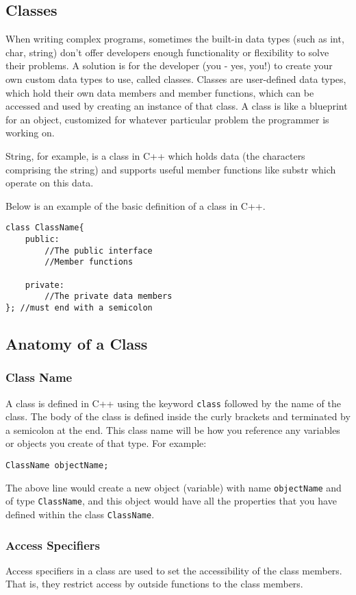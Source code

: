 \subsection{Classes}
When writing complex programs, sometimes the built-in data types (such as int, char, string) don’t offer developers enough functionality or flexibility to solve their problems. A solution is for the developer (you - yes, you!) to create your own custom data types to use, called classes. Classes are user-defined data types, which hold their own data members and member functions, which can be accessed and used by creating an instance of that class. A class is like a blueprint for an object, customized for whatever particular problem the programmer is working on.

String, for example, is a class in C++ which holds data (the characters comprising the string) and supports useful member functions like substr which operate on this data.

Below is an example of the basic definition of a class in C++.

\begin{verbatim}
class ClassName{
    public:
        //The public interface
        //Member functions

    private:
        //The private data members
}; //must end with a semicolon
\end{verbatim}

\subsection{Anatomy of a Class}
\subsubsection{Class Name}
A class is defined in C++ using the keyword \texttt{class} followed by the name of the class. The body of the class is defined inside the curly brackets and terminated by a semicolon at the end. This class name will be how you reference any variables or objects you create of that type. For example: 

\texttt{ClassName objectName;}

The above line would create a new object (variable) with name \texttt{objectName} and of type \texttt{ClassName}, and this object would have all the properties that you have defined within the class \texttt{ClassName}.

\subsubsection{Access Specifiers}
Access specifiers in a class are used to set the accessibility of the class members. That is, they restrict access by outside functions to the class members.

